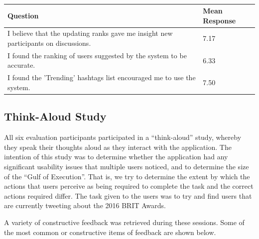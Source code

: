 \documentclass{l4proj}
\begin{document}
\begin{table}[H]
    \centering
    \begin{tabular}{| l | l |}
    \hline
    Question & Mean Response \\ \hline
    I believe that the updating ranks gave me insight new participants on discussions. & 7.17 \\ \hline
    I found the ranking of users suggested by the system to be accurate. & 6.33  \\ \hline
    I found the 'Trending' hashtags list encouraged me to use the system. & 7.50 \\
    \hline
    \end{tabular}
    \caption{\label{table:posteval2}}
\end{table}
 
    \subsection{Think-Aloud Study}
    All six evaluation participants participated in a ``think-aloud'' study, whereby they speak their thoughts aloud as they interact with the application. The intention of this study was to determine whether the application had any significant usability issues that multiple users noticed, and to determine the size of the ``Gulf of Execution''. That is, we try to determine the extent by which the actions that users perceive as being required to complete the task and the correct actions required differ. The task given to the users was to try and find users that are currently tweeting about the 2016 BRIT Awards.
    
    A variety of constructive feedback was retrieved during these sessions. Some of the most common or constructive items of feedback are shown below.
    
\end{document}
